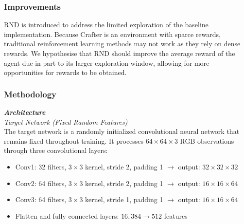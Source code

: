 \documentclass[twocolumn]{article}
\begin{document}
\subsubsection*{Improvements}
RND is introduced to address the limited exploration of the baseline implementation. Because Crafter is an environment with sparce rewards, traditional reinforcement learning methods may not work as they rely on dense rewards. We hypothesise that RND should improve the average reward of the agent due in part to its larger exploration window, allowing for more opportunities for rewards to be obtained.

\subsubsection*{Methodology}
\textbf{\textit{Architecture}}\\
\textit{Target Network (Fixed Random Features)} \\
The target network is a randomly initialized convolutional neural network that remains fixed throughout training. It processes $64 \times 64 \times 3$ RGB observations through three convolutional layers:
\begin{itemize}
    \item Conv1: 32 filters, $3 \times 3$ kernel, stride 2, padding 1 $\rightarrow$ output: $32 \times 32 \times 32$
    \item Conv2: 64 filters, $3 \times 3$ kernel, stride 2, padding 1 $\rightarrow$ output: $16 \times 16 \times 64$
    \item Conv3: 64 filters, $3 \times 3$ kernel, stride 1, padding 1 $\rightarrow$ output: $16 \times 16 \times 64$
    \item Flatten and fully connected layers: $16{,}384 \rightarrow 512$ features
\end{itemize}
\end{document}
